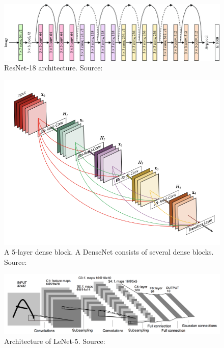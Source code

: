 \begin{figure}
    \centering
    \includegraphics[width=0.9\linewidth]{images/arch/ResNet-18-model-architecture-10.png}
    \caption{ResNet-18 architecture. Source: \cite{almezhghwi_improved_2020}}
    \label{fig:arch-resnet18}
\end{figure}

\begin{figure}
    \centering
    \includegraphics[width=0.6\linewidth]{images/arch/densenet.png}
    \caption{A 5-layer dense block. A DenseNet consists of several dense blocks. Source: \cite{huang_densely_2017}}
    \label{fig:arch-densenet}
\end{figure}

\begin{figure}
    \centering
    \includegraphics[width=0.9\linewidth]{images/arch/lenet5.png}
    \caption{Architecture of LeNet-5. Source: \cite{lecun_gradient-based_1998}}
    \label{fig:lenet5}
\end{figure}